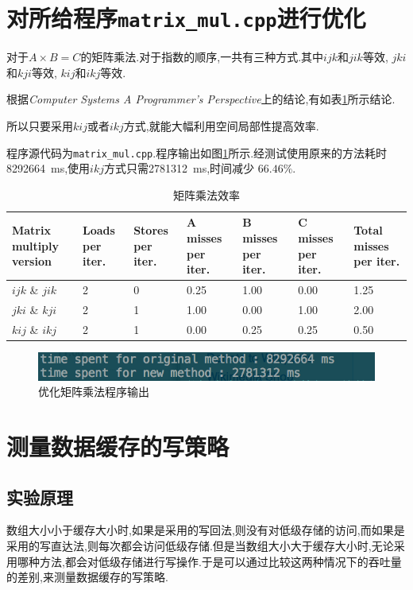 \documentclass[adobefonts, nocap]{ctexart}
\begin{document}
  \section{对所给程序\texttt{matrix\_mul.cpp}进行优化}
    对于$A\times B=C$的矩阵乘法.对于指数的顺序,一共有三种方式.其中$ijk$和$jik$等效, $jki$和$kji$等效, $kij$和$ikj$等效.

    根据\textit{Computer Systems A Programmer's Perspective}上的结论,有如表\ref{tab1}所示结论.

    所以只要采用$kij$或者$ikj$方式,就能大幅利用空间局部性提高效率.

    程序源代码为\texttt{matrix\_mul.cpp}.程序输出如图\ref{fig9}所示.经测试使用原来的方法耗时\SI{8292664}{\ms},使用$ikj$方式只需\SI{2781312}{\ms},时间减少
    $66.46\%$.

    \begin{table}[htbp]
      \caption{矩阵乘法效率}
      \label{tab1}
      \centering
      \begin{tabular}{p{1.5cm} p{1.5cm} p{1.5cm} p{1.5cm} p{1.5cm} p{1.5cm} p{1.5cm}}
        Matrix multiply version & Loads per iter. & Stores per iter. & A misses per iter. & B misses per iter. & C misses per iter. & Total misses per iter. \\
        \hline
        $ijk$ \& $jik$ & 2 & 0 & 0.25 & 1.00 & 0.00 & 1.25 \\
        $jki$ \& $kji$ & 2 & 1 & 1.00 & 0.00 & 1.00 & 2.00 \\
        $kij$ \& $ikj$ & 2 & 1 & 0.00 & 0.25 & 0.25 & 0.50 \\
      \end{tabular}
    \end{table}

    \begin{figure}[htbp]
      \includegraphics[width=12cm]{9.png}
      \caption{优化矩阵乘法程序输出}
      \label{fig9}
    \end{figure}
    \clearpage
  \section{测量数据缓存的写策略}
    \subsection{实验原理}
      数组大小小于缓存大小时,如果是采用的写回法,则没有对低级存储的访问,而如果是采用的写直达法,则每次都会访问低级存储.但是当数组大小大于缓存大小时,无论采用哪种方法,都会对低级存储进行写操作.于是可以通过比较这两种情况下的吞吐量的差别,来测量数据缓存的写策略.
\end{document}
